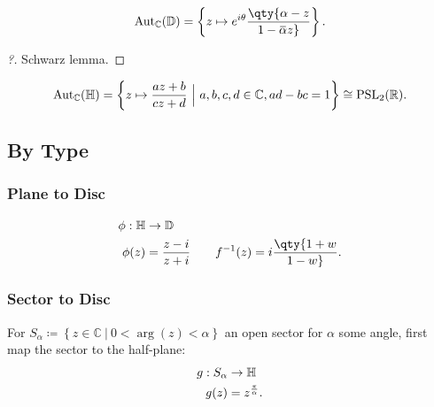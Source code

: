 \begin{theorem}

\begin{align*}
{\operatorname{Aut}}_{\mathbb{C}}({\mathbb{D}}) = \left\{{ z\mapsto e^{i\theta} \qty{\alpha - z \over 1 - \mkern 1.5mu\overline{\mkern-1.5mu\alpha\mkern-1.5mu}\mkern 1.5mu z} }\right\}
.\end{align*}

\end{theorem}

\begin{proof}[?]

Schwarz lemma.

\end{proof}

\begin{theorem}[?]

\begin{align*}
{\operatorname{Aut}}_{\mathbb{C}}({\mathbb{H}}) = \left\{{ z \mapsto {az+b \over cz+d} {~\mathrel{\Big|}~}a,b,c,d\in {\mathbb{C}}, ad-bc=1 }\right\} \cong{\operatorname{PSL}}_2({\mathbb{R}})
.\end{align*}

\end{theorem}

\hypertarget{by-type}{%
\subsection{By Type}\label{by-type}}

\hypertarget{plane-to-disc}{%
\subsubsection{Plane to Disc}\label{plane-to-disc}}

\begin{align*}
\phi: {\mathbb{H}}&\to {\mathbb{D}}\\
\phi(z) &= {z - i \over z + i} \qquad f^{-1}(z) = i\qty{1 + w \over 1 - w}
.\end{align*}

\hypertarget{sector-to-disc}{%
\subsubsection{Sector to Disc}\label{sector-to-disc}}

For
\(S_\alpha \coloneqq\left\{{z\in{\mathbb{C}}{~\mathrel{\Big|}~}0 < \arg(z) < \alpha }\right\}\)
an open sector for \(\alpha\) some angle, first map the sector to the
half-plane:
\begin{align*}
g: S_\alpha &\to {\mathbb{H}}\\
g(z) &= z^{\pi \over \alpha}
.\end{align*}

